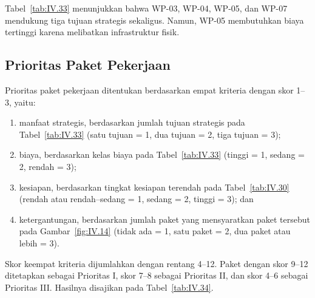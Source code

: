 Tabel~\ref{tab:IV.33} menunjukkan bahwa WP-03, WP-04, WP-05, dan WP-07 mendukung tiga tujuan strategis sekaligus. Namun, WP-05 membutuhkan biaya tertinggi karena melibatkan infrastruktur fisik.

\subsection{Prioritas Paket Pekerjaan}
\label{sec:IV.8.3}

Prioritas paket pekerjaan ditentukan berdasarkan empat kriteria dengan skor 1–3, yaitu:

\begin{enumerate}[label=\arabic*.]
\item manfaat strategis, berdasarkan jumlah tujuan strategis pada Tabel~\ref{tab:IV.33} (satu tujuan = 1, dua tujuan = 2, tiga tujuan = 3);
\item biaya, berdasarkan kelas biaya pada Tabel~\ref{tab:IV.33} (tinggi = 1, sedang = 2, rendah = 3);
\item kesiapan, berdasarkan tingkat kesiapan terendah pada Tabel~\ref{tab:IV.30} (rendah atau rendah–sedang = 1, sedang = 2, tinggi = 3); dan
\item ketergantungan, berdasarkan jumlah paket yang mensyaratkan paket tersebut pada Gambar~\ref{fig:IV.14} (tidak ada = 1, satu paket = 2, dua paket atau lebih = 3).
\end{enumerate}

Skor keempat kriteria dijumlahkan dengan rentang 4–12. Paket dengan skor 9–12 ditetapkan sebagai Prioritas I, skor 7–8 sebagai Prioritas II, dan skor 4–6 sebagai Prioritas III. Hasilnya disajikan pada Tabel~\ref{tab:IV.34}.

